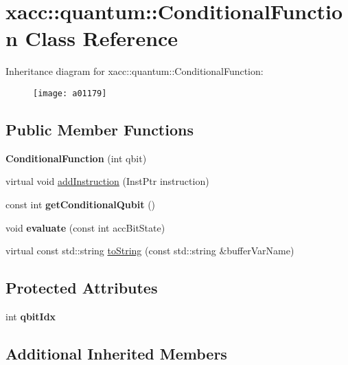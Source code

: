 \hypertarget{a01179}{}\section{xacc\+:\+:quantum\+:\+:Conditional\+Function Class Reference}
\label{a01179}
Inheritance diagram for xacc\+:\+:quantum\+:\+:Conditional\+Function\+:\begin{figure}[H]
\begin{center}
\leavevmode
\texttt{[image: a01179]}
\end{center}
\end{figure}
\subsection*{Public Member Functions}
\begin{DoxyCompactItemize}
\item 
\mbox{\label{a01179_aa28610a08ae04d62ccdd8359433100c3}} 
{\bfseries Conditional\+Function} (int qbit)
\item 
virtual void \hyperlink{a01179_a6aedad20f96390880efdc0a476b3273f}{add\+Instruction} (Inst\+Ptr instruction)
\item 
\mbox{\label{a01179_a804317333b6677a041a3071b5108c0df}} 
const int {\bfseries get\+Conditional\+Qubit} ()
\item 
\mbox{\label{a01179_a709c236a5beb62d9a3bd5265196fb6c9}} 
void {\bfseries evaluate} (const int acc\+Bit\+State)
\item 
virtual const std\+::string \hyperlink{a01179_aca7a5f849fece6fc28a904efee9a3370}{to\+String} (const std\+::string \&buffer\+Var\+Name)
\end{DoxyCompactItemize}
\subsection*{Protected Attributes}
\begin{DoxyCompactItemize}
\item 
\mbox{\label{a01179_a0310536801417c0eded28a4dea1efa44}} 
int {\bfseries qbit\+Idx}
\end{DoxyCompactItemize}
\subsection*{Additional Inherited Members}


